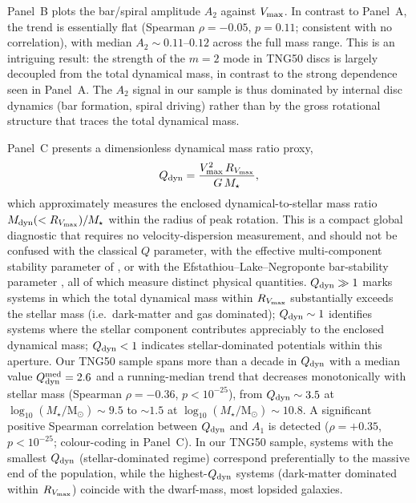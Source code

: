 \documentclass[fleqn,usenatbib]{mnras}
\newcommand{\Am}[1]{A_{#1}}
\newcommand{\Msun}{\mathrm{M}_{\odot}}
\newcommand{\Amone}{\ensuremath{\Am{1}}}
\newcommand{\Amtwo}{\ensuremath{\Am{2}}}
\begin{document}
Panel~B plots the bar/spiral amplitude $\Amtwo$ against
$V_{\rm max}$.  In contrast to Panel~A, the trend is essentially
flat (Spearman $\rho = -0.05$, $p = 0.11$; consistent with no
correlation), with median $\Amtwo \sim 0.11$--$0.12$ across the
full mass range.  This is an intriguing result: the strength of
the $m=2$ mode in TNG50 discs is largely decoupled from the total
dynamical mass, in contrast to the strong dependence seen in
Panel~A.
The $\Amtwo$ signal in our sample is thus dominated by internal
disc dynamics (bar formation, spiral driving) rather than by the
gross rotational structure that traces the total dynamical mass.

Panel~C presents a dimensionless dynamical mass ratio proxy,
\begin{equation}
  Q_{\rm dyn} = \frac{V_{\rm max}^{2}\,R_{V_{\rm max}}}{G\,M_\star},
  \label{eq:Q_dyn}
\end{equation}
which approximately measures the enclosed dynamical-to-stellar
mass ratio $M_{\rm dyn}(<R_{V_{\rm max}})/M_\star$ within the
radius of peak rotation.  This is a compact global diagnostic
that requires no velocity-dispersion measurement, and should not
be confused with the classical \citet{1964ApJ...139.1217T} $Q$ parameter,
with the effective multi-component stability parameter of
\citet{2011MNRAS.416.1191R}, or with the
Efstathiou--Lake--Negroponte bar-stability parameter
\citep{1982MNRAS.199.1069E}, all of which measure distinct physical
quantities.
$Q_{\rm dyn} \gg 1$ marks systems in which the total dynamical
mass within $R_{V_{\rm max}}$ substantially exceeds the stellar
mass (i.e.\ dark-matter and gas dominated); $Q_{\rm dyn} \sim 1$
identifies systems where the stellar component contributes
appreciably to the enclosed dynamical mass; $Q_{\rm dyn} < 1$
indicates stellar-dominated potentials within this aperture.  Our
TNG50 sample spans more than a decade in $Q_{\rm dyn}$ with a
median value $Q_{\rm dyn}^{\rm med} = 2.6$ and a running-median
trend that decreases monotonically with stellar mass (Spearman
$\rho = -0.36$, $p < 10^{-25}$), from $Q_{\rm dyn} \sim 3.5$ at
$\log_{10}(M_\star/\Msun) \sim 9.5$ to $\sim 1.5$ at
$\log_{10}(M_\star/\Msun) \sim 10.8$.  A significant positive
Spearman correlation between $Q_{\rm dyn}$ and $\Amone$ is
detected ($\rho = +0.35$, $p < 10^{-25}$; colour-coding in
Panel~C).  In our TNG50 sample, systems with the smallest
$Q_{\rm dyn}$ (stellar-dominated regime) correspond preferentially
to the massive end of the population, while the highest-$Q_{\rm dyn}$
systems (dark-matter dominated within $R_{V_{\rm max}}$) coincide
with the dwarf-mass, most lopsided galaxies.
\end{document}
